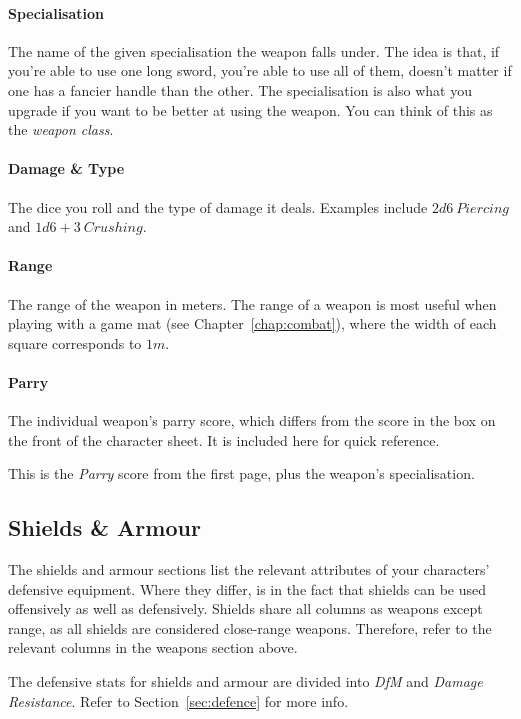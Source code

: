 \paragraph{Specialisation} The name of the given specialisation the weapon falls under.
The idea is that, if you're able to use one long sword, you're able to use all of them, doesn't matter if one has a fancier handle than the other. 
The specialisation is also what you upgrade if you want to be better at using the weapon.
You can think of this as the \textit{weapon class}.

\paragraph{Damage \& Type} The dice you roll and the type of damage it deals.
Examples include $2d6\ \mathit{Piercing}$ and $1d6+3\ \mathit{Crushing}$.

\paragraph{Range} The range of the weapon in meters.
The range of a weapon is most useful when playing with a game mat (see Chapter~\ref{chap:combat}), where the width of each square corresponds to $1m$.

\paragraph{Parry} The individual weapon's parry score, which differs from the score in the box on the front of the character sheet.
It is included here for quick reference.

This is the \textit{Parry} score from the first page, plus the weapon's specialisation.

\subsection{Shields \& Armour}
The shields and armour sections list the relevant attributes of your characters' defensive equipment.
Where they differ, is in the fact that shields can be used offensively as well as defensively.
Shields share all columns as weapons except range, as all shields are considered close-range weapons.
Therefore, refer to the relevant columns in the weapons section above.

The defensive stats for shields and armour are divided into \textit{DfM} and \textit{Damage Resistance}.
Refer to Section~\ref{sec:defence} for more info.

